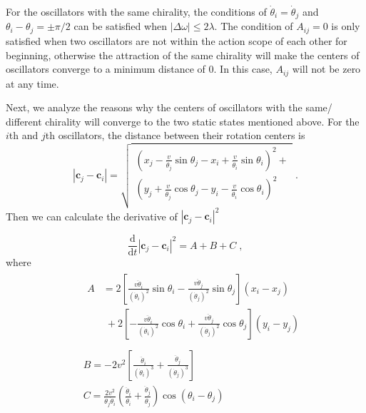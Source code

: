 \documentclass[%
 aip,
 amsmath,amssymb,
 reprint,%
]{revtex4-1}
\begin{document}
For the oscillators with the same chirality, the conditions of $\dot{\theta}_i=\dot{\theta}_j$ and $\theta _i-\theta _j=\pm\pi/2$ can be satisfied when $\left| \Delta \omega \right|\leqslant 2\lambda$. The condition of $A_{ij}=0$ is only satisfied when two oscillators are not within the action scope of each other for beginning, otherwise the attraction of the same chirality will make the centers of oscillators converge to a minimum distance of $0$. In this case, $A_{ij}$ will not be zero at any time. 

Next, we analyze the reasons why the centers of oscillators with the same/ different chirality will converge to the two static states mentioned above.
For the $i$th and $j$th oscillators, the distance between their rotation centers is
\begin{equation}\label{eq:distanceCenter}
    \left| \mathbf{c}_j-\mathbf{c}_i \right|=\sqrt{\begin{array}{l}
        \left( x_j-\frac{v}{\dot{\theta}_j}\sin \theta _j-x_i+\frac{v}{\dot{\theta}_i}\sin \theta _i \right) ^2+\\
        \left( y_j+\frac{v}{\dot{\theta}_j}\cos \theta _j-y_i-\frac{v}{\dot{\theta}_i}\cos \theta _i \right) ^2\\
    \end{array}}\;.
\end{equation}
Then we can calculate the derivative of $\left| \mathbf{c}_j-\mathbf{c}_i \right|^2$

\begin{equation}\label{eq:distanceCenterDerivative}
    \frac{\mathrm{d}}{\mathrm{d}t}\left| \mathbf{c}_j-\mathbf{c}_i \right|^2=A+B+C\;,
\end{equation}
where 
\begin{eqnarray}
    &&\begin{aligned}
        A&=2\left[ \frac{v\ddot{\theta}_i}{\left( \dot{\theta}_i \right) ^2}\sin \theta _i-\frac{v\ddot{\theta}_j}{\left( \dot{\theta}_j \right) ^2}\sin \theta _j \right] \left( x_i-x_j \right)\\
        &\;+2\left[ -\frac{v\ddot{\theta}_i}{\left( \dot{\theta}_i \right) ^2}\cos \theta _i+\frac{v\ddot{\theta}_j}{\left( \dot{\theta}_j \right) ^2}\cos \theta _j \right] \left( y_i-y_j \right)\\
    \end{aligned}\\
	&&B=-2v^2\left[ \frac{\ddot{\theta}_i}{\left( \dot{\theta}_i \right) ^3}+\frac{\ddot{\theta}_j}{\left( \dot{\theta}_j \right) ^3} \right]\\
	&&C=\frac{2v^2}{\dot{\theta}_j\dot{\theta}_i}\left( \frac{\ddot{\theta}_i}{\dot{\theta}_i}+\frac{\ddot{\theta}_j}{\dot{\theta}_j} \right) \cos \left( \theta _i-\theta _j \right)
\end{eqnarray}
\end{document}
